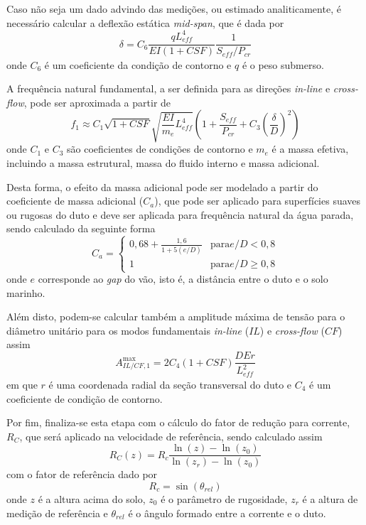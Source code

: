 Caso não seja um dado advindo das medições, ou estimado analiticamente, é necessário calcular a deflexão estática \textit{mid-span}, que é dada por
\begin{equation}
\label{eq:viv-deflex}
\delta = C_6 \frac{q L_\mathit{eff}^4}{\mathit{EI} (1 + \mathit{CSF})} \frac{1}{S_\mathit{eff}/P_\mathit{cr}}
\end{equation}
onde $C_6$ é um coeficiente da condição de contorno e $q$ é o peso submerso.

A frequência natural fundamental, a ser definida para as direções \textit{in-line} e \textit{cross-flow}, pode ser aproximada a partir de
\begin{equation}
\label{eq:viv-f1}
f_1 \approx C_1 \sqrt{1 + \mathit{CSF}}\sqrt{\frac{\mathit{EI}}{m_e} L_\mathit{eff}^4} \left(1 + \frac{S_\mathit{eff}}{P_\mathit{cr}} + C_3 {\left(\frac{\delta}{D}\right)}^2\right)
\end{equation}
onde $C_1$ e $C_3$ são coeficientes de condições de contorno e $m_e$ é a massa efetiva, incluindo a massa estrutural, massa do fluido interno e massa adicional.

Desta forma, o efeito da massa adicional pode ser modelado a partir do coeficiente de massa adicional ($C_a$), que pode ser aplicado para superfícies suaves ou rugosas do duto e deve ser aplicada para frequência natural da água parada, sendo calculado da seguinte forma
\begin{equation}
\label{eq:viv-Ca}
C_a =
\begin{cases}
	0,68 + \frac{1,6}{1 + 5 (e/D)} & \mathrm{para} e/D < 0,8 \\
	1                              & \mathrm{para} e/D \geq 0,8
\end{cases}
\end{equation}
onde $e$ corresponde ao \textit{gap} do vão, isto é, a distância entre o duto e o solo marinho.

Além disto, podem-se calcular também a amplitude máxima de tensão para o diâmetro unitário para os modos fundamentais \textit{in-line} ($\mathit{IL}$) e \textit{cross-flow} ($\mathit{CF}$) assim
\begin{equation}
\label{eq:viv-Ailcf}
A_{\mathit{IL}/\mathit{CF}, 1}^{\max} = 2 C_4(1 + \mathit{CSF})\frac{D E r}{L_\mathit{eff}^2}
\end{equation}
em que $r$ é uma coordenada radial da seção transversal do duto e $C_4$ é um coeficiente de condição de contorno.


Por fim, finaliza-se esta etapa com o cálculo do fator de redução para corrente, $R_C$, que será aplicado na velocidade de referência, sendo calculado assim
\begin{equation}
\label{eq:viv-R_C}
R_C(z) = R_c \frac{\ln(z)-\ln(z_0)}{\ln(z_r)-\ln(z_0)}
\end{equation}
com o fator de referência dado por
\begin{equation}
\nonumber
R_c = \sin(\theta_\mathit{rel})
\end{equation}
onde $z$ é a altura acima do solo, $z_0$ é o parâmetro de rugosidade, $z_r$ é a altura de medição de referência e $\theta_\mathit{rel}$ é o ângulo formado entre a corrente e o duto.

